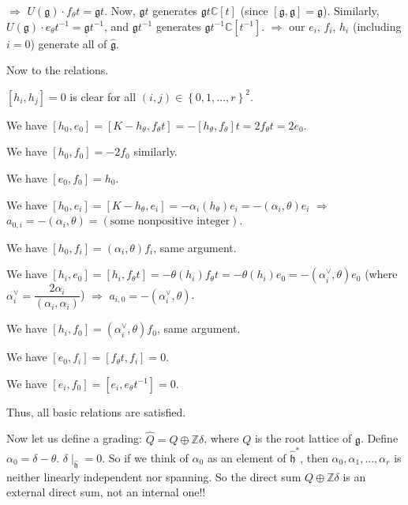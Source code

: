 \documentclass[etingof-lie.tex]{subfiles}
\begin{document}
$\Longrightarrow$ $U\left(  \mathfrak{g}\right)  \cdot f_{\theta
}t=\mathfrak{g}t$. Now, $\mathfrak{g}t$ generates $\mathfrak{g}t\mathbb{C}%
\left[  t\right]  $ (since $\left[  \mathfrak{g},\mathfrak{g}\right]
=\mathfrak{g}$). Similarly, $U\left(  \mathfrak{g}\right)  \cdot e_{\theta
}t^{-1}=\mathfrak{g}t^{-1}$, and $\mathfrak{g}t^{-1}$ generates $\mathfrak{g}%
t^{-1}\mathbb{C}\left[  t^{-1}\right]  $. $\Longrightarrow$ our $e_{i}$,
$f_{i}$, $h_{i}$ (including $i=0$) generate all of $\widehat{\mathfrak{g}}$.

Now to the relations.

$\left[  h_{i},h_{j}\right]  =0$ is clear for all $\left(  i,j\right)
\in\left\{  0,1,...,r\right\}  ^{2}$.

We have $\left[  h_{0},e_{0}\right]  =\left[  K-h_{\theta},f_{\theta}t\right]
=-\left[  h_{\theta},f_{\theta}\right]  t=2f_{\theta}t=2e_{0}$.

We have $\left[  h_{0},f_{0}\right]  =-2f_{0}$ similarly.

We have $\left[  e_{0},f_{0}\right]  =h_{0}$.

We have $\left[  h_{0},e_{i}\right]  =\left[  K-h_{\theta},e_{i}\right]
=-\alpha_{i}\left(  h_{\theta}\right)  e_{i}=-\left(  \alpha_{i}%
,\theta\right)  e_{i}$ $\Longrightarrow$ $a_{0,i}=-\left(  \alpha_{i}%
,\theta\right)  =\left(  \text{some nonpositive integer}\right)  $.

We have $\left[  h_{0},f_{i}\right]  =\left(  \alpha_{i},\theta\right)  f_{i}%
$, same argument.

We have $\left[  h_{i},e_{0}\right]  =\left[  h_{i},f_{\theta}t\right]
=-\theta\left(  h_{i}\right)  f_{\theta}t=-\theta\left(  h_{i}\right)
e_{0}=-\left(  \alpha_{i}^{\vee},\theta\right)  e_{0}$ (where $\alpha
_{i}^{\vee}=\dfrac{2\alpha_{i}}{\left(  \alpha_{i},\alpha_{i}\right)  }$)
$\Longrightarrow$ $a_{i,0}=-\left(  \alpha_{i}^{\vee},\theta\right)  $.

We have $\left[  h_{i},f_{0}\right]  =\left(  \alpha_{i}^{\vee},\theta\right)
f_{0}$, same argument.

We have $\left[  e_{0},f_{i}\right]  =\left[  f_{\theta}t,f_{i}\right]  =0$.

We have $\left[  e_{i},f_{0}\right]  =\left[  e_{i},e_{\theta}t^{-1}\right]
=0$.

Thus, all basic relations are satisfied.

Now let us define a grading: $\widehat{Q}=Q\oplus\mathbb{Z}\delta$, where $Q$
is the root lattice of $\mathfrak{g}$. Define $\alpha_{0}=\delta-\theta$.
$\delta\mid_{\widehat{\mathfrak{h}}}=0$. So if we think of $\alpha_{0}$ as an
element of $\widehat{\mathfrak{h}}^{\ast}$, then $\alpha_{0},\alpha
_{1},...,\alpha_{r}$ is neither linearly independent nor spanning. So the
direct sum $Q\oplus\mathbb{Z}\delta$ is an external direct sum, not an
internal one!!
\end{document}
